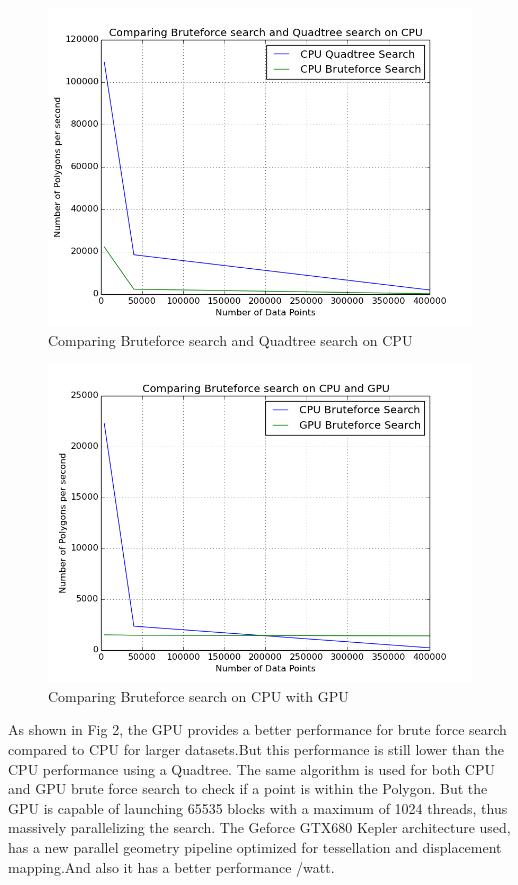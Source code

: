 \documentclass{article}
\begin{document}
\begin{figure}[H]
\centering
    \includegraphics[scale=0.55]{BruteVsQuadCPU_logscale_new_2}
    \caption{Comparing Bruteforce search and Quadtree search on CPU}
  \end{figure}

\begin{figure}[H]
\centering
    \includegraphics[scale=0.55]{CPU_GPU_brute_new_2}
    \caption{Comparing Bruteforce search on CPU with GPU}
  \end{figure}



As shown in Fig 2, the GPU provides a better performance for brute force search compared to CPU for larger datasets.But this performance is still lower than the CPU performance using a Quadtree.
The same algorithm is used for both CPU and GPU brute force search to check if a point is within the Polygon. But the  GPU is capable of launching 65535 blocks with a maximum of 1024 threads, thus massively parallelizing the search.
The Geforce GTX680 Kepler architecture used, has a new parallel geometry pipeline optimized for tessellation and displacement mapping.And also it has a better performance /watt.
\end{document}
